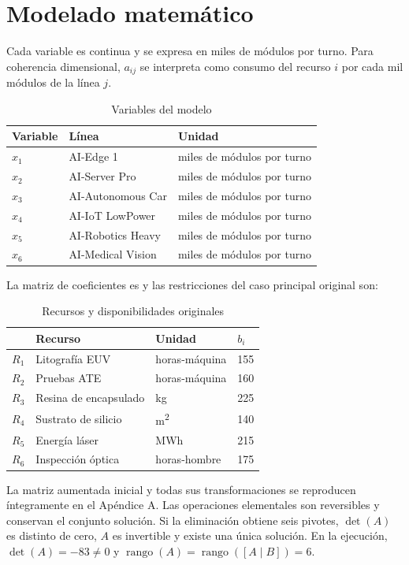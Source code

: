 \documentclass[conference]{IEEEtran}
\begin{document}
\section{Modelado matemático}
Cada variable es continua y se expresa en miles de módulos por turno. Para coherencia dimensional, $a_{ij}$ se interpreta como consumo del recurso $i$ por cada mil módulos de la línea $j$.
\begin{table}[ht]\caption{Variables del modelo}\centering\footnotesize\begin{tabular}{lll}\toprule Variable&Línea&Unidad\\\midrule $x_1$ & AI-Edge 1 & miles de módulos por turno \\
$x_2$ & AI-Server Pro & miles de módulos por turno \\
$x_3$ & AI-Autonomous Car & miles de módulos por turno \\
$x_4$ & AI-IoT LowPower & miles de módulos por turno \\
$x_5$ & AI-Robotics Heavy & miles de módulos por turno \\
$x_6$ & AI-Medical Vision & miles de módulos por turno \\\bottomrule\end{tabular}\end{table}
La matriz de coeficientes es
y las restricciones del caso principal original son:
\begin{table}[ht]\caption{Recursos y disponibilidades originales}\centering\scriptsize\begin{tabular}{llll}\toprule&Recurso&Unidad&$b_i$\\\midrule $R_1$ & Litografía EUV & horas-máquina & 155 \\
$R_2$ & Pruebas ATE & horas-máquina & 160 \\
$R_3$ & Resina de encapsulado & kg & 225 \\
$R_4$ & Sustrato de silicio & m\textsuperscript{2} & 140 \\
$R_5$ & Energía láser & MWh & 215 \\
$R_6$ & Inspección óptica & horas-hombre & 175 \\\bottomrule\end{tabular}\end{table}
La matriz aumentada inicial y todas sus transformaciones se reproducen íntegramente en el Apéndice A.
Las operaciones elementales son reversibles y conservan el conjunto solución. Si la eliminación obtiene seis pivotes, $\det(A)$ es distinto de cero, $A$ es invertible y existe una única solución. En la ejecución, $\det(A)=-83\neq0$ y $\operatorname{rango}(A)=\operatorname{rango}([A\mid B])=6$.
\end{document}
